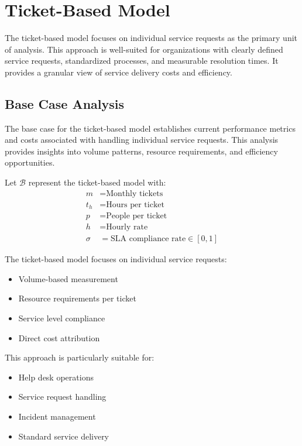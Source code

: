 \documentclass[12pt,a4paper]{article}
\newenvironment{definition}[1]
{\begin{mdframed}[style=definitionstyle,frametitle={Definition: #1}]}
{\end{mdframed}}
\newenvironment{explanation}
{\begin{mdframed}[style=explanationstyle,frametitle={Explanation}]}
{\end{mdframed}}
\begin{document}
\section{Ticket-Based Model}
The ticket-based model focuses on individual service requests as the primary unit of analysis. This approach is well-suited for organizations with clearly defined service requests, standardized processes, and measurable resolution times. It provides a granular view of service delivery costs and efficiency.

\subsection{Base Case Analysis}
The base case for the ticket-based model establishes current performance metrics and costs associated with handling individual service requests. This analysis provides insights into volume patterns, resource requirements, and efficiency opportunities.

\begin{definition}{Ticket Model Variables}
Let $\mathcal{B}$ represent the ticket-based model with:
\begin{align*}
    m &= \text{Monthly tickets} \\
    t_h &= \text{Hours per ticket} \\
    p &= \text{People per ticket} \\
    h &= \text{Hourly rate} \\
    \sigma &= \text{SLA compliance rate} \in [0,1]
\end{align*}
\end{definition}

\begin{explanation}
The ticket-based model focuses on individual service requests:
\begin{itemize}
    \item Volume-based measurement
    \item Resource requirements per ticket
    \item Service level compliance
    \item Direct cost attribution
\end{itemize}

This approach is particularly suitable for:
\begin{itemize}
    \item Help desk operations
    \item Service request handling
    \item Incident management
    \item Standard service delivery
\end{itemize}
\end{explanation}
\end{document}
